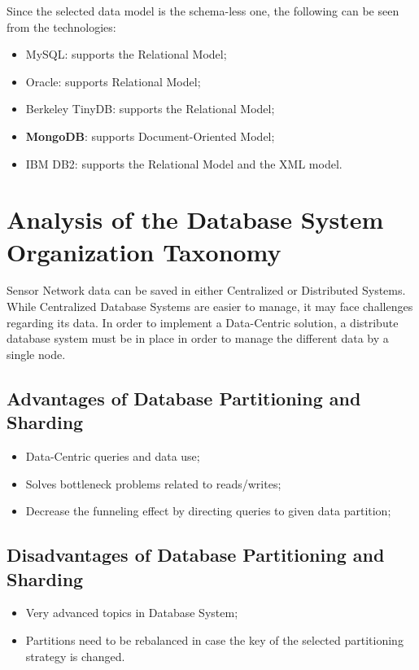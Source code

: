 Since the selected data model is the schema-less one, the following can be seen
from the technologies:

\begin{itemize}
  \item MySQL: supports the Relational Model;
  \item Oracle: supports Relational Model;
  \item Berkeley TinyDB: supports the Relational Model; 
  \item \textbf{MongoDB}: supports Document-Oriented Model;
  \item IBM DB2: supports the Relational Model and the XML model.
\end{itemize}

\section{Analysis of the Database System Organization Taxonomy}

Sensor Network data can be saved in either Centralized or Distributed Systems.
While Centralized Database Systems are easier to manage, it may
face challenges regarding its data. In order to implement a Data-Centric
solution, a distribute database system must be in place in order to manage
the different data by a single node.

\subsection{Advantages of Database Partitioning and Sharding}

\begin{itemize}
  \item Data-Centric queries and data use;
  \item Solves bottleneck problems related to reads/writes;
  \item Decrease the funneling effect by directing queries to given data
  partition;
\end{itemize}

\subsection{Disadvantages of Database Partitioning and Sharding}

\begin{itemize}
  \item Very advanced topics in Database System;
  \item Partitions need to be rebalanced in case the key of the selected 
  partitioning strategy is changed.
\end{itemize}

